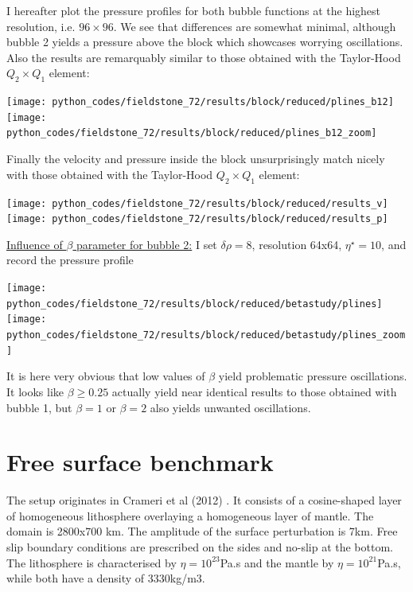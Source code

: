 I hereafter plot the pressure profiles for both bubble functions at the highest resolution, i.e. $96\times 96$.
We see that differences are somewhat minimal, although bubble 2 yields a pressure above the block which 
showcases worrying oscillations. Also the results are remarquably similar to those obtained with the Taylor-Hood
$Q_2\times Q_1$ element:

\begin{center}
\texttt{[image: python\_codes/fieldstone\_72/results/block/reduced/plines\_b12]}
\texttt{[image: python\_codes/fieldstone\_72/results/block/reduced/plines\_b12\_zoom]}
\end{center}

Finally the velocity and pressure inside the block unsurprisingly match nicely with those obtained with the Taylor-Hood
$Q_2\times Q_1$ element:

\begin{center}
\texttt{[image: python\_codes/fieldstone\_72/results/block/reduced/results\_v]}
\texttt{[image: python\_codes/fieldstone\_72/results/block/reduced/results\_p]}
\end{center}


\underline{Influence of $\beta$ parameter for bubble 2:} I set $\delta\rho=8$, resolution 64x64, $\eta^\star=10$,
and record the pressure profile 

\begin{center}
\texttt{[image: python\_codes/fieldstone\_72/results/block/reduced/betastudy/plines]}
\texttt{[image: python\_codes/fieldstone\_72/results/block/reduced/betastudy/plines\_zoom]}
\end{center}

It is here very obvious that low values of $\beta$ yield problematic pressure oscillations. 
It looks like $\beta \geq 0.25$ actually yield near identical results to those obtained with bubble 1,
but $\beta=1$ or $\beta=2$ also yields unwanted oscillations.

\section*{Free surface benchmark}

The setup originates in Crameri et al (2012) \cite{crsg12}. It consists of 
a cosine-shaped layer of homogeneous lithosphere overlaying a homogeneous layer of mantle.
The domain is 2800x700 km. The amplitude of the surface perturbation is 7km. 
Free slip boundary conditions are prescribed on the sides and no-slip at the bottom. 
The lithosphere is characterised by $\eta=10^{23}$Pa.s and the mantle by $\eta=10^{21}$Pa.s, 
while both have a density of 3330kg/m3.

